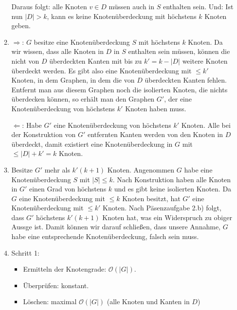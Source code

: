 \documentclass[a4paper]{scrartcl}
\newcommand{\Oh}{\mathcal{O}}
\begin{document}
\begin{enumerate}[label=\bfseries \arabic*.]
\begin{enumerate}
        Daraus folgt: alle Knoten $v \in D$ müssen auch in $S$ enthalten sein.
        Und: Ist nun $|D| > k$, kann es keine Knotenüberdeckung mit höchstens
        $k$ Knoten geben.

    \item %
        $\Rightarrow$:
        $G$ besitze eine Knotenüberdeckung $S$ mit höchstens $k$ Knoten.
        Da wir wissen, dass alle Knoten in $D$ in $S$ enthalten sein müssen,
        können die nicht von $D$ überdeckten Kanten mit bis zu $k' = k - |D|$
        weitere Knoten überdeckt werden.
        Es gibt also eine Knotenüberdeckung mit $\leq k'$ Knoten, in dem
        Graphen, in dem die von $D$ überdeckten Kanten fehlen.
        Entfernt man aus diesem Graphen noch die isolierten Knoten, die nichts
        überdecken können, so erhält man den Graphen $G'$, der eine
        Knotenüberdeckung von höchstens $k'$ Knoten haben muss.

        $\Leftarrow$:
        Habe $G'$ eine Knotenüberdeckung von höchstens $k'$ Knoten.
        Alle bei der Konstruktion von $G'$ entfernten Kanten werden von den
        Knoten in $D$ überdeckt, damit existiert eine Knotenüberdeckung in $G$
        mit $\leq |D| + k' = k$ Knoten.

    \item %
        Besitze $G'$ mehr als $k'(k+1)$ Knoten.
        Angenommen $G$ habe eine Knotenüberdeckung $S$ mit $|S| \leq k$.
        Nach Konstruktion haben alle Knoten in $G'$ einen Grad von höchstens
        $k$ und es gibt keine isolierten Knoten.
        Da $G$ eine Knotenüberdeckung mit $\leq k$ Knoten besitzt, hat $G'$
        eine Knotenüberdeckung mit $\leq k'$ Knoten.
        Nach Päsenzaufgabe 2.b) folgt, dass $G'$ höchstens $k'(k+1)$ Knoten hat,
        was ein Widerspruch zu obiger Aussge ist. Damit können wir darauf
        schließen, dass unsere Annahme, $G$ habe eine entsprechende
        Knotenüberdeckung, falsch sein muss.



    \item %
        Schritt 1:
        \begin{itemize}
            \item Ermitteln der Knotengrade: $\Oh(|G|)$.
            \item Überprüfen: konstant.
            \item Löschen: maximal $\Oh(|G|)$ (alle Knoten und Kanten in $D$)
        \end{itemize}


\end{enumerate}
\end{enumerate}
\end{document}
